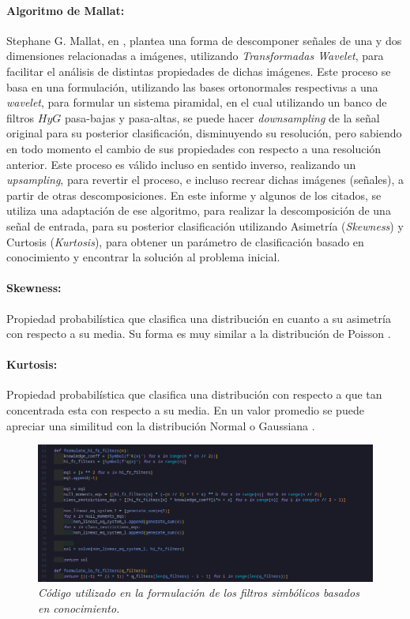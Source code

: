 \documentclass[11pt]{article}
\begin{document}
\paragraph*{Algoritmo de Mallat:}
Stephane G. Mallat, en \cite{mallat}, plantea una forma de descomponer señales de una y dos dimensiones relacionadas a imágenes, utilizando {\it Transformadas Wavelet}, para facilitar el análisis 
de distintas propiedades de dichas imágenes. Este proceso se basa en una formulación, utilizando las bases ortonormales respectivas a una {\it wavelet}, para formular un sistema piramidal, en el cual utilizando un banco de filtros \(H y G\) pasa-bajas y pasa-altas, se puede 
hacer {\it downsampling} de la señal original para su posterior clasificación, disminuyendo su resolución, pero sabiendo en todo momento el cambio de sus propiedades con respecto a una resolución anterior. Este proceso es válido incluso en sentido inverso, realizando un {\it upsampling}, para 
revertir el proceso, e incluso recrear dichas imágenes (señales), a partir de otras descomposiciones. En este informe y algunos de los citados, se utiliza una adaptación de ese algoritmo, para realizar la descomposición de una señal de entrada, para su posterior clasificación utilizando 
Asimetría ({\it Skewness}) y Curtosis ({\it Kurtosis}), para obtener un parámetro de clasificación basado en conocimiento y encontrar la solución al problema inicial.

\paragraph*{Skewness:}
Propiedad probabilística que clasifica una distribución en cuanto a su asimetría con respecto a su media. Su forma es muy similar a la distribución de Poisson \cite{skew}.

\paragraph*{Kurtosis:}
Propiedad probabilística que clasifica una distribución con respecto a que tan concentrada esta con respecto a su media. En un valor promedio se puede apreciar una similitud con la distribución Normal o Gaussiana \cite{kurt}.

\pagebreak

\begin{figure}
    \includegraphics[width=\textwidth]{filters}
    \caption{\it Código utilizado en la formulación de los filtros simbólicos basados en conocimiento.}
\end{figure}
\end{document}
